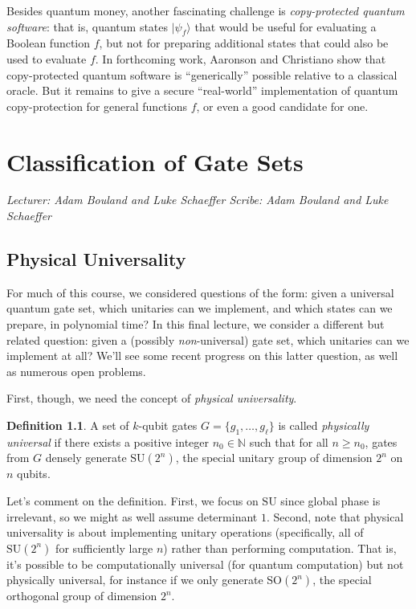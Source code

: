 \documentclass[11pt]{report}
\theoremstyle{plain}
\theoremstyle{definition}
\newtheorem{definition}[theorem]{Definition}
\newcommand{\N}{{\mathbb N}}
\renewcommand{\ket}[1]{|#1\rangle}
\newcommand{\lecture}[3]{%
  \chapter{#3}%
  \vspace{-5ex}%
  \textit{Lecturer: #1 \hfill Scribe: #2}\par%
  \vspace{1ex}\titlerule\vspace{2ex}}
\begin{document}
Besides quantum money, another fascinating challenge is {\em copy-protected quantum software}: that is, quantum states $\ket{\psi_f}$ that would be useful for evaluating a Boolean function $f$, but not for preparing additional states that could also be used to evaluate $f$.  In forthcoming work, Aaronson and Christiano show that copy-protected quantum software is ``generically'' possible relative to a classical oracle.  But it remains to give a secure ``real-world'' implementation of quantum copy-protection for general functions $f$, or even a good candidate for one.

\lecture{Adam Bouland and Luke Schaeffer}{Adam Bouland and Luke Schaeffer}{Classification of Gate Sets}

\section{Physical Universality}

For much of this course, we considered questions of the form: given a universal quantum gate set, which unitaries can we implement, and which states can we prepare, in polynomial time?  In this final lecture, we consider a different but related question: given a (possibly \emph{non}-universal) gate set, which unitaries can we implement at all?  We'll see some recent progress on this latter question, as well as numerous open problems.

First, though, we need the concept of {\em physical universality}.

\begin{definition}
A set of $k$-qubit gates $G = \{ g_1, \ldots, g_\ell \}$ is called \emph{physically universal} if there exists a positive integer $n_0 \in \N$ such that for all $n \geq n_0$, gates from $G$ densely generate $\mathrm{SU}(2^n)$, the special unitary group of dimension $2^n$ on $n$ qubits.
\end{definition}

Let's comment on the definition.  First, we focus on $\mathrm{SU}$ since global phase is irrelevant, so we might as well assume determinant $1$.  Second, note that physical universality is about implementing unitary operations (specifically, all of $\mathrm{SU}(2^n)$ for sufficiently large $n$) rather than performing computation. That is, it's possible to be computationally universal (for quantum computation) but not physically universal, for instance if we only generate $\mathrm{SO}(2^n)$, the special orthogonal group of dimension $2^n$.
\end{document}
